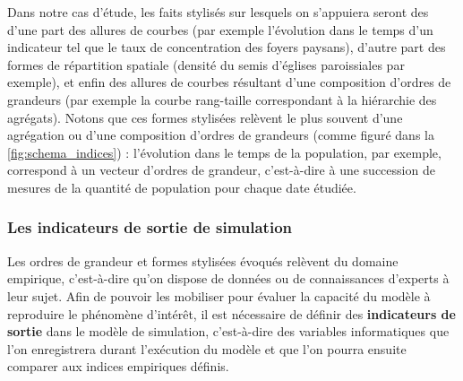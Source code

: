 Dans notre cas d'étude, les faits stylisés sur lesquels on s'appuiera seront des d'une part des \og allures\fg{} de courbes (par exemple l'évolution dans le temps d'un indicateur tel que le taux de concentration des foyers paysans), d'autre part des formes de répartition spatiale (densité du semis d'églises paroissiales par exemple), et enfin des \og allures\fg{} de courbes résultant d'une composition d'ordres de grandeurs (par exemple la courbe rang-taille correspondant à la hiérarchie des agrégats).
Notons que ces formes stylisées relèvent le plus souvent d'une agrégation ou d'une composition d'ordres de grandeurs (comme figuré dans la \cref{fig:schema_indices}) :
l'évolution dans le temps de la population, par exemple, correspond à un vecteur d'ordres de grandeur, c'est-à-dire à une succession de mesures de la quantité de population pour chaque date étudiée.



\subsubsection{Les indicateurs de sortie de simulation}


Les ordres de grandeur et formes stylisées évoqués relèvent du domaine empirique, c'est-à-dire qu'on dispose de données ou de connaissances d'experts à leur sujet.
Afin de pouvoir les mobiliser pour évaluer la capacité du modèle à reproduire le phénomène d'intérêt, il est nécessaire de définir des \textbf{indicateurs de sortie} dans le modèle de simulation, c'est-à-dire des variables informatiques que l'on enregistrera durant l'exécution du modèle et que l'on pourra ensuite comparer aux indices empiriques définis.



